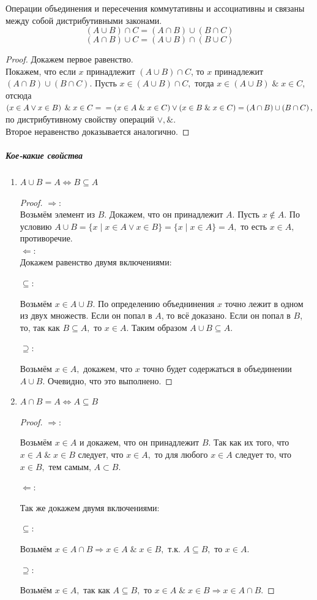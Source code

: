 \documentclass{article}
\begin{document}
Операции объединения и пересечения коммутативны и ассоциативны и связаны между собой дистрибутивными законами.
$$\left(A\cup B\right)\cap C = \left(A\cap B\right)\cup\left(B\cap C\right)$$
$$\left(A\cap B\right)\cup C = \left(A\cup B\right)\cap\left(B\cup C\right)$$
\begin{proof}
Докажем первое равенство. \\
Покажем, что если $x$ принадлежит $\left(A\cup B\right)\cap C$, то $x$ принадлежит $\left(A\cap B\right)\cup\left(B\cap C\right).$ Пусть $x\in \left(A\cup B\right)\cap C,$ тогда $x\in \left(A \cup B\right) \;\&\;x\in C$, отсюда $\left( x\in A \vee x\in B\right) \;\&\; x\in C = 
\\=\left(x\in A \;\&\; x\in C\right) \vee \left(x\in B \;\&\; x\in C\right) = \left(A\cap B\right)\cup\left(B\cap C\right),$ по дистрибутивному свойству операций $\vee,\&.$\\
Второе неравенство доказывается аналогично.
\end{proof}
\subparagraph{Кое-какие свойства}
\begin{enumerate}
\item $A\cup B = A \Leftrightarrow B\subseteq A$
\begin{proof}
$\Rightarrow:$
\\Возьмём элемент из $B.$ Докажем, что он принадлежит $A.$ Пусть $x\notin A.$ По условию $A\cup B = \{x\mid x\in A \vee x\in B\} = \{x\mid x\in A\} = A,$ то есть $x\in A,$ противоречие.\\
$\Leftarrow:$\\
Докажем равенство двумя включениями:

$\subseteq:$

Возьмём $x\in A\cup B.$ По определению объеднинения $x$ точно лежит в одном из двух множеств. Если он попал в $A$, то всё доказано. Если он попал в $B$, то, так как $B\subseteq A,$ то $x\in A.$ Таким образом $A\cup B\subseteq A.$

$\supseteq:$

Возьмём $x\in A,$ докажем, что $x$ точно будет содержаться в объединении $A\cup B.$ Очевидно, что это выполнено.
\end{proof}
\item $A\cap B = A \Leftrightarrow A\subseteq B$
\begin{proof}
$\Rightarrow:$

Возьмём $x\in A$ и докажем, что он принадлежит $B.$ Так как их того, что $x\in A \; \& \; x\in B$ следует, что $x\in A,$ то для любого $x\in A$ следует то, что $x\in B,$ тем самым, $A\subset B.$
\newpage

$\Leftarrow:$

Так же докажем двумя включениями:

$\subseteq:$

Возьмём $x\in A\cap B \Rightarrow x\in A \; \& \; x\in B,$ т.к. $A\subseteq B,$ то $x\in A.$

$\supseteq:$

Возьмём $x\in A,$ так как $A\subseteq B,$ то $x\in A \; \& \; x\in B \Rightarrow x\in A\cap B.$
\end{proof}
\end{enumerate}
\end{document}
